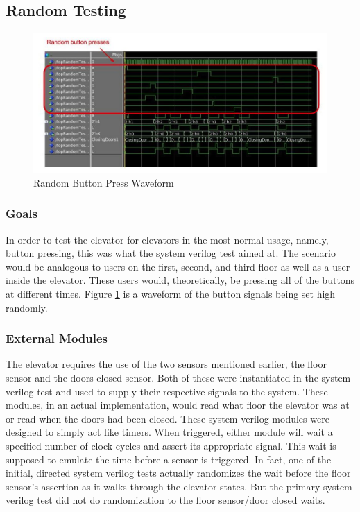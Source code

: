 \documentclass[journal]{IEEEtran}
\begin{document}
\subsection{Random Testing}

\begin{figure}[t]
\centering
\includegraphics[width=0.9\linewidth]{RandomButtonTestWaveform}
\caption{Random Button Press Waveform}
\label{bttn_press_waveform}
\end{figure}

\subsubsection{Goals}
In order to test the elevator for elevators in the most normal usage, namely, button pressing, this was what the system verilog test aimed at. The scenario would be analogous to users on the first, second, and third floor as well as a user inside the elevator. These users would, theoretically, be pressing all of the buttons at different times. Figure \ref{bttn_press_waveform} is a waveform of the button signals being set high randomly.

\subsubsection{External Modules}
The elevator requires the use of the two sensors mentioned earlier, the floor sensor and the doors closed sensor. Both of these were instantiated in the system verilog test and used to supply their respective signals to the system. These modules, in an actual implementation, would read what floor the elevator was at or read when the doors had been closed. These system verilog modules were designed to simply act like timers. When triggered, either module will wait a specified number of clock cycles and assert its appropriate signal. This wait is supposed to emulate the time before a sensor is triggered. In fact, one of the initial, directed system verilog tests actually randomizes the wait before the floor sensor’s assertion as it walks through the elevator states. But the primary system verilog test did not do randomization to the floor sensor/door closed waits.
\end{document}
